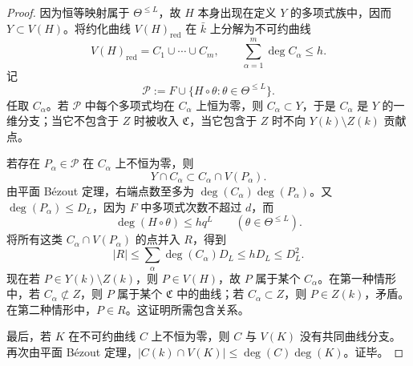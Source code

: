 \begin{proof}
因为恒等映射属于 \(\Theta^{\le L}\)，故 \(H\) 本身出现在定义 \(Y\) 的多项式族中，因而 \(Y\subset V(H)\)。将约化曲线 \(V(H)_{\mathrm{red}}\) 在 \(\bar k\) 上分解为不可约曲线
\[
V(H)_{\mathrm{red}}=C_1\cup\cdots\cup C_m,
\qquad
\sum_{\alpha=1}^m\deg C_\alpha\le h.
\]
记
\[
\mathcal P:=F\cup\{H\circ\theta:\theta\in\Theta^{\le L}\}.
\]
任取 \(C_\alpha\)。若 \(\mathcal P\) 中每个多项式均在 \(C_\alpha\) 上恒为零，则 \(C_\alpha\subset Y\)，于是 \(C_\alpha\) 是 \(Y\) 的一维分支；当它不包含于 \(Z\) 时被收入 \(\mathfrak C\)，当它包含于 \(Z\) 时不向 \(Y(k)\setminus Z(k)\) 贡献点。

若存在 \(P_\alpha\in\mathcal P\) 在 \(C_\alpha\) 上不恒为零，则
\[
Y\cap C_\alpha\subset C_\alpha\cap V(P_\alpha).
\]
由平面 Bézout 定理，右端点数至多为 \(\deg(C_\alpha)\deg(P_\alpha)\)。又 \(\deg(P_\alpha)\le D_L\)，因为 \(F\) 中多项式次数不超过 \(d\)，而
\[
\deg(H\circ\theta)\le hq^L
\qquad(\theta\in\Theta^{\le L}).
\]
将所有这类 \(C_\alpha\cap V(P_\alpha)\) 的点并入 \(R\)，得到
\[
|R|\le \sum_\alpha \deg(C_\alpha)D_L\le hD_L\le D_L^2.
\]
现在若 \(P\in Y(k)\setminus Z(k)\)，则 \(P\in V(H)\)，故 \(P\) 属于某个 \(C_\alpha\)。在第一种情形中，若 \(C_\alpha\not\subset Z\)，则 \(P\) 属于某个 \(\mathfrak C\) 中的曲线；若 \(C_\alpha\subset Z\)，则 \(P\in Z(k)\)，矛盾。在第二种情形中，\(P\in R\)。这证明所需包含关系。

最后，若 \(K\) 在不可约曲线 \(C\) 上不恒为零，则 \(C\) 与 \(V(K)\) 没有共同曲线分支。再次由平面 Bézout 定理，\(|C(k)\cap V(K)|\le\deg(C)\deg(K)\)。证毕。
\end{proof}
